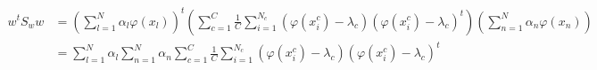 \begin{align*}
  w^tS_ww &= \left( \sum_{l=1}^N \alpha_l \varphi(x_l)\right)^t
             \left( \sum_{c=1}^C \frac{1}{C}
                       \sum_{i=1}^{N_c} (\varphi(x_i^c) - \lambda_c)
                                        (\varphi(x_i^c) - \lambda_c)^t\right)
             \left( \sum_{n=1}^N \alpha_n \varphi(x_n)\right)\\
          &= \sum_{l=1}^N \alpha_l \sum_{n=1}^N \alpha_n \sum_{c=1}^C \frac{1}{C}
                \sum_{i=1}^{N_c} (\varphi(x_i^c) - \lambda_c)
                                 (\varphi(x_i^c) - \lambda_c)^t
\end{align*}



